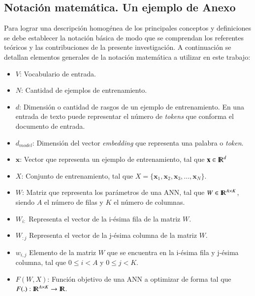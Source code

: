 \appendixes

\renewcommand{\appendixname}{Anexo}
\renewcommand{\appendixtocname}{Anexos}
\renewcommand{\appendixpagename}{Anexos}
\begin{addendum}
	
	\chapter{Notación matemática. Un ejemplo de Anexo}
	
	Para lograr una descripción homogénea de los principales conceptos y definiciones se debe establecer la notación básica de modo que se comprendan los referentes teóricos y las contribuciones de la presente investigación. A continuación se detallan elementos generales de la notación matemática a utilizar en este trabajo:
	
	\begin{itemize}
		\item $V$: Vocabulario de entrada.
		\item $N$: Cantidad de ejemplos de entrenamiento.
		\item $d$: Dimensión o cantidad de rasgos de un ejemplo de entrenamiento. En una entrada de texto puede representar el número de \textit{tokens} que conforma el documento de entrada.
		\item $d_{model}$: Dimensión del vector \textit{embedding} que representa una palabra o \textit{token}.
		\item $\mathbf{x}$: Vector que representa un ejemplo de entrenamiento, tal que $\mathbf{x}\in {\rm I\!R}^{d}$
		\item $X$: Conjunto de entrenamiento, tal que $X=\{\mathbf{x}_1,\mathbf{x}_2,\mathbf{x}_3,..., \mathbf{x}_N\}$.
		\item $W$: Matriz que representa los parámetros de una ANN, tal que $W \in {\rm I\!R}^{A \times K}$, siendo $A$ el número de filas y $K$ el número de columnas.
		\item $W_{i:}$ Representa el vector de la i-ésima fila de la matriz $W$.
		\item $W_{:j}$ Representa el vector de la j-ésima columna de la matriz $W$.
		\item $w_{i,j}$ Elemento de la matriz $W$ que se encuentra en la i-ésima fila y j-ésima columna, tal que $0 \le i < A$ y $0 \le j < K$.
		\item $F(W,X)$: Función objetivo de una ANN a optimizar de forma tal que $F(.):{\rm I\!R}^{A \times K} \rightarrow {\rm I\!R}$.
	\end{itemize}
	
	
		
\end{addendum}
